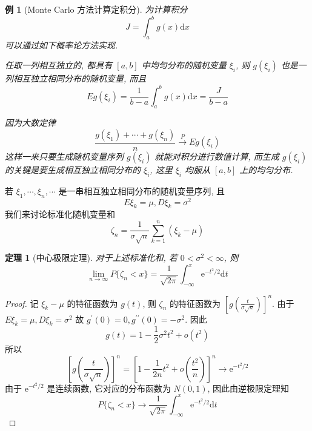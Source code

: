 \documentclass[12pt,a4paper]{article}
\newtheorem{thm}{定理}[subsection]  %
\newtheorem{example}{例}[subsection] %
\begin{document}
\begin{example}[Monte Carlo 方法计算定积分]
    为计算积分 \[J = \int_a^b g(x) \mathrm{d}x\] 可以通过如下概率论方法实现.

    任取一列相互独立的, 都具有 $[a,b]$ 中均匀分布的随机变量 ${\xi_i}$, 则 ${g(\xi_i)}$ 也是一列相互独立相同分布的随机变量, 而且
    \[ Eg(\xi_i) = \frac{1}{b-a}  \int_a^b g(x) \mathrm{d}x  = \frac{J}{b-a}\]

    因为大数定律 \[ \frac{g(\xi_1) + \cdots + g(\xi_n)}{n} \overset{P}{\to} Eg(\xi_i) \]
    这样一来只要生成随机变量序列 ${g(\xi_i)}$ 就能对积分进行数值计算, 而生成 ${g(\xi_i)}$ 的关键是要生成相互独立相同分布的 ${\xi_i}$, 这里 $\xi_i$ 均服从 $[a,b]$ 上的均匀分布.
\end{example}

若 $\xi_1, \cdots, \xi_n, \cdots$ 是一串相互独立相同分布的随机变量序列, 且 \[E\xi_k = \mu, D \xi_k = \sigma^2\]
我们来讨论标准化随机变量和 \[\zeta_n = \frac{1}{\sigma \sqrt{n}} \sum\limits_{k=1}^n (\xi_k - \mu)\]

\begin{thm}[中心极限定理]
    对于上述标准化和, 若 $0 < \sigma^2 < \infty$, 则
    \[\lim_{n \to \infty} P\{\zeta_n < x\} = \frac{1}{\sqrt{2\pi}} \int_{-\infty}^x \mathrm{e}^{-t^2/2} \mathrm{d} t\]
\end{thm}

\begin{proof}
    记 $\xi_k - \mu$ 的特征函数为 $g(t)$, 则 $\zeta_n$ 的特征函数为 $\left[g\left( \frac{t}{\sigma \sqrt{n}} \right)\right]^n$. 
    由于 $E \xi_k = \mu, D \xi_k = \sigma^2$ 故 $g^{\prime}(0) = 0, g^{\prime \prime}(0) = -\sigma^2$. 因此
    \[g(t) = 1 -\frac{1}{2}\sigma^2 t^2 + o(t^2)\]
    所以 \[ \left[g \left( \frac{t}{\sigma \sqrt{n}} \right)\right]^n = \left[ 1 - \frac{1}{2n} t^2 + o(\frac{t^2}{n}) \right]^n \to \mathrm{e}^{-t^2/2} \]
    由于 $\mathrm{e}^{-t^2/2}$ 是连续函数, 它对应的分布函数为 $N(0,1)$, 因此由逆极限定理知
    \[P\{ \zeta_n < x\} \to \frac{1}{\sqrt{2\pi}} \int_{-\infty}^x \mathrm{e}^{-t^2/2} \mathrm{d}t\]
\end{proof}
\end{document}
